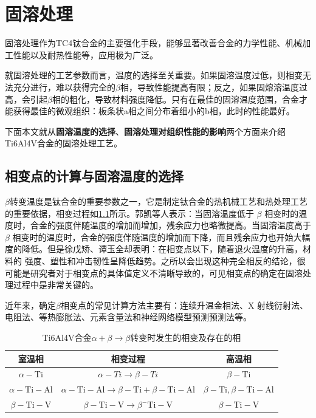 \documentclass[
class = book,
zihao = -4,
font = noto,
paper = a4paper,
openany
]{easybook}
\newcommand{\ti}{Ti6Al4V}
\begin{document}
\chapter{固溶处理}
固溶处理作为TC4钛合金的主要强化手段，能够显著改善合金的力学性能、机械加工性能以及耐热性能等，应用极为广泛。

就固溶处理的工艺参数而言，温度的选择至关重要。如果固溶温度过低，则相变无法充分进行，难以获得完全的$\beta$相，导致性能提高有限；反之，如果固熔溶温度过高，会引起$ \beta $相的粗化，导致材料强度降低。只有在最佳的固溶温度范围，合金才能获得最佳的微观组织：板条状a相之间分布着细小的b相，此时的性能最好。

下面本文就从\textbf{固溶温度的选择}、\textbf{固溶处理对组织性能的影响}两个方面来介绍\ti 合金的固溶处理工艺。


\section{相变点的计算与固溶温度的选择}
$\beta$转变温度是钛合金的重要参数之一，它是制定钛合金的热机械工艺和热处理工艺的重要依据，相变过程如\ref{sec:Tc4betachange}所示。郭凯\cite{guokaiTC4taihejinrechuligongyideyanjiuxianzhuangjijinzhan2021}等人表示：当固溶温度低于 $\beta$ 相变时的温度时，合金的强度伴随温度的增加而增加，残余应力也略微提高。当固溶温度高于 $\beta$ 相变时的温度时，合金的强度伴随温度的增加而下降，而且残余应力也开始大幅度的降低。但是徐戊矫、谭玉全\cite{xujianGurongshixiaogongyiduiTC4taihejinzuzhijixingnengdeyingxiang2014}却表明：在相变点以下，随着退火温度的升高，材料的 强度、塑性和冲击韧性呈降低趋势。之所以会出现这种完全相反的结论，很可能是研究者对于相变点的具体值定义不清晰导致的，可见相变点的确定在固溶处理过程中是非常关键的。

近年来，确定$ \beta $相变点的常见计算方法\cite{zhuhongTaihejinaVxiangbiandiandejizhongceshifangfatantao2013}主要有：连续升温金相法、X 射线衍射法、电阻法、等热膨胀法、元素含量法和神经网络模型预测预测法\cite{renchiqiangGurongshixiaoduiTC4taihejinxianweizuzhihelixuexingnengdeyingxiang2022}等。
\begin{table}[htbp]
	\centering
	\caption{\ti 合金$ \alpha+\beta \to \beta $转变时发生的相变及存在的相}
	\label{sec:Tc4betachange}
\begin{tabular}{ccc}
	\toprule 室温相 & 相变过程 & 高温相 \\
	\midrule$\alpha-\mathrm{Ti}$ & $\alpha-T i \rightarrow \beta-T i$ & $\beta-\mathrm{Ti}$ \\
	$\alpha-\mathrm{Ti}-\mathrm{Al}$ & $\alpha-\mathrm{Ti}-\mathrm{Al} \rightarrow \beta-\mathrm{Ti}+\beta-\mathrm{Ti}-\mathrm{Al}$ & $\beta-\mathrm{Ti}, \beta-\mathrm{Ti}-\mathrm{Al}$ \\
	$\beta- \mathrm{Ti}-\mathrm{V}$ & $\beta-\mathrm{Ti}-\mathrm{V} \rightarrow \beta^{-} \mathrm{Ti}-\mathrm{V}$ & $\beta-\mathrm{Ti}-\mathrm{V}$ \\
	\bottomrule
\end{tabular}
\end{table}
\end{document}
